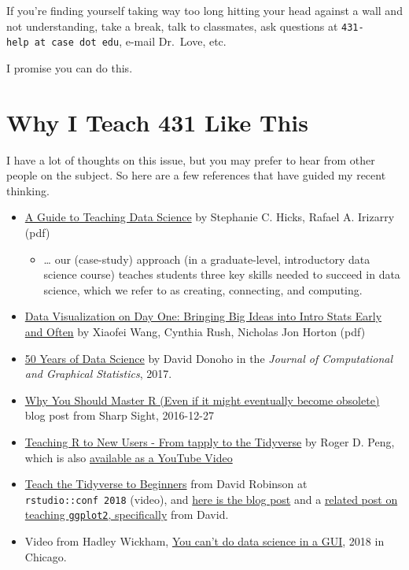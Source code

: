 \documentclass[
]{book}
\providecommand{\tightlist}{%
  \setlength{\itemsep}{0pt}\setlength{\parskip}{0pt}}
\begin{document}
If you're finding yourself taking way too long hitting your head against a wall and not understanding, take a break, talk to classmates, ask questions at \texttt{431-help\ at\ case\ dot\ edu}, e-mail Dr.~Love, etc.

I promise you can do this.

\hypertarget{why-i-teach-431-like-this-1}{%
\section{Why I Teach 431 Like This}\label{why-i-teach-431-like-this-1}}

I have a lot of thoughts on this issue, but you may prefer to hear from other people on the subject. So here are a few references that have guided my recent thinking.

\begin{itemize}
\tightlist
\item
  \href{https://arxiv.org/abs/1612.07140}{A Guide to Teaching Data Science} by Stephanie C. Hicks, Rafael A. Irizarry (pdf)

  \begin{itemize}
  \tightlist
  \item
    \ldots{} our (case-study) approach (in a graduate-level, introductory data science course) teaches students three key skills needed to succeed in data science, which we refer to as creating, connecting, and computing.
  \end{itemize}
\item
  \href{https://arxiv.org/abs/1705.08544}{Data Visualization on Day One: Bringing Big Ideas into Intro Stats Early and Often} by Xiaofei Wang, Cynthia Rush, Nicholas Jon Horton (pdf)
\item
  \href{https://www.tandfonline.com/doi/full/10.1080/10618600.2017.1384734}{50 Years of Data Science} by David Donoho in the \emph{Journal of Computational and Graphical Statistics}, 2017.
\item
  \href{https://www.sharpsightlabs.com/blog/master-r-obsolete/}{Why You Should Master R (Even if it might eventually become obsolete)} blog post from Sharp Sight, 2016-12-27
\item
  \href{https://simplystatistics.org/2018/07/12/use-r-keynote-2018/}{Teaching R to New Users - From tapply to the Tidyverse} by Roger D. Peng, which is also \href{https://www.youtube.com/watch?v=5033jBHFiHE\&feature=youtu.be}{available as a YouTube Video}
\item
  \href{https://www.rstudio.com/resources/videos/teach-the-tidyverse-to-beginners/}{Teach the Tidyverse to Beginners} from David Robinson at \texttt{rstudio::conf\ 2018} (video), and \href{http://varianceexplained.org/r/teach-tidyverse/}{here is the blog post} and a \href{http://varianceexplained.org/r/teach_ggplot2_to_beginners/}{related post on teaching \texttt{ggplot2}, specifically} from David.
\item
  Video from Hadley Wickham, \href{https://www.youtube.com/watch?v=PURtmHwk_-0}{You can't do data science in a GUI}, 2018 in Chicago.
\end{itemize}
\end{document}
